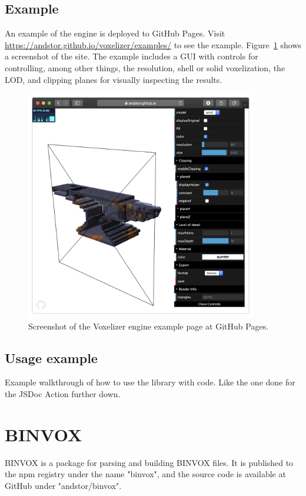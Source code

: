 \subsection{Example}
An example of the engine is deployed to GitHub Pages. Visit \url{https://andstor.github.io/voxelizer/examples/} to see the example. Figure~\ref{fig:voxelizer-example} shows a screenshot of the site. The example includes a GUI with controls for controlling, among other things, the resolution, shell or solid voxelization, the LOD, and clipping planes for visually inspecting the results.
\begin{figure}[ht]
    \centering
    \includegraphics[width=0.9\textwidth]{sections/result/figures/voxelizer-example.png}
    \caption{Screenshot of the Voxelizer engine example page at GitHub Pages.}
    \label{fig:voxelizer-example}
\end{figure}

\subsection{Usage example}
Example walkthrough of how to use the library with code.
Like the one done for the JSDoc Action further down.



\section{BINVOX}
BINVOX is a package for parsing and building BINVOX files. It is published to the npm registry under the name "binvox", and the source code is available at GitHub under "andstor/binvox".

